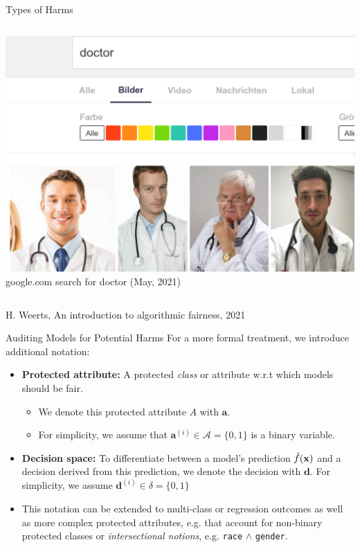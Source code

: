 \documentclass[11pt,compress,t,notes=noshow, xcolor=table]{beamer}
\newcommand{\dv}{\mathbf{d}} %
\newcommand{\av}{\mathbf{a}} %
\newcommand{\Dspace}{\delta} %
\newcommand{\Aspace}{\mathcal{A}} %
\begin{document}
\begin{vbframe}{Types of Harms}
\begin{columns}
        \begin{column}{0.5\textwidth}
            \begin{center}
                \vspace{-0.5cm}
                \includegraphics[height=0.3\textheight]{figures/doctor.png}
                \tiny{google.com search for doctor (May, 2021)}
            \end{center}
        \end{column}
    \end{columns}
    
    \vfill
    \tiny{H. Weerts, An introduction to algorithmic fairness, 2021}
\end{vbframe}



\begin{vbframe}{Auditing Models for Potential Harms}
    \small
    For a more formal treatment, we introduce additional notation:
    \begin{itemize}
        \small 
        \item \textbf{Protected attribute:} A protected \emph{class} or attribute w.r.t which models should be fair. 
        \begin{itemize}
            \small
            \item We denote this protected attribute $A$ with $\av$. 
            \item For simplicity, we assume that $\av^{(i)} \in \Aspace = \{0,1\}$ is a binary variable.
        \end{itemize}
        
        \item \textbf{Decision space:} To differentiate between a model's prediction $\hat{f}(\mathbf{x})$ and a decision derived from this prediction, we denote the decision  with $\dv$. For simplicity, we assume $\dv^{(i)} \in \Dspace = \{0, 1\}$

        \item This notation can be extended to multi-class or regression outcomes as well as more complex protected attributes, e.g. that account for non-binary protected classes or \emph{intersectional notions}, e.g. \texttt{race} $\land$ \texttt{gender}.
    \end{itemize}
\end{vbframe}
\end{document}
